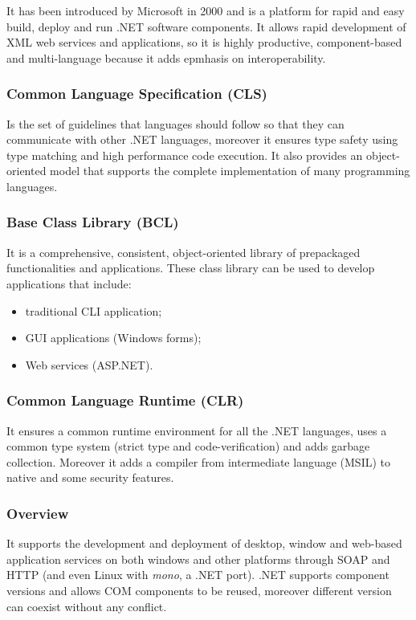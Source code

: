 It has been introduced by Microsoft in 2000 and is a platform for rapid and easy build, deploy and run .NET software components.
It allows rapid development of XML web services and applications, so it is highly productive, component-based and multi-language because it adds epmhasis on interoperability.

\subsubsection{Common Language Specification (CLS)}
Is the set of guidelines that languages should follow so that they can communicate with other .NET languages, moreover it ensures type safety using type matching and high performance code execution.
It also provides an object-oriented model that supports the complete implementation of many programming languages.

\subsubsection{Base Class Library (BCL)}
It is a comprehensive, consistent, object-oriented library of prepackaged functionalities and applications.
These class library can be used to develop applications that include:
\begin{itemize}
    \item traditional CLI application;
    \item GUI applications (Windows forms);
    \item Web services (ASP.NET).
\end{itemize}

\subsubsection{Common Language Runtime (CLR)}
It ensures a common runtime environment for all the .NET languages, uses a common type system (strict type and code-verification) and adds garbage collection.
Moreover it adds a compiler from intermediate language (MSIL) to native and some security features.

\subsubsection{Overview}
It supports the development and deployment of desktop, window and web-based application services on both windows and other platforms through SOAP and HTTP (and even Linux with \emph{mono}, a .NET port).
.NET supports component versions and allows COM components to be reused, moreover different version can coexist without any conflict.

